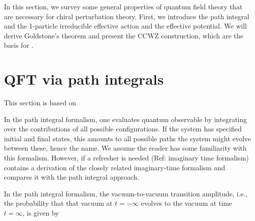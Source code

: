 In this section, we survey some general properties of quantum field theory that are necessary for chiral perturbation theory.
First, we introduce the path integral and the 1-particle irreducible effective action and the effective potential.
We will derive Goldstone's theorem and present the CCWZ construction, which are the basis for \chpt.

\section[QFT via path integrals*]{QFT via path integrals}
\label{section: path integral}

This section is based on \autocite{peskinIntroductionQuantumField1995,weinbergQuantumTheoryFields1995,weinbergQuantumTheoryFields1996,schwartzQuantumFieldTheory2013}

In the path integral formalism, one evaluates quantum observable by integrating over the contributions of all possible configurations.
If the system has specified initial and final states, this amounts to all possible paths the system might evolve between these, hence the name.
We assume the reader has some familiarity with this formalism. 
However, if a refresher is needed (Ref: imaginary time formalism)
contains a derivation of the closely related imaginary-time formalism and compares it with the path integral approach.

In the path integral formalism, the vacuum-to-vacuum transition amplitude, i.e., the probability that that vacuum at $t = -\infty$ evolves to the vacuum at time $t = \infty$, is given by

